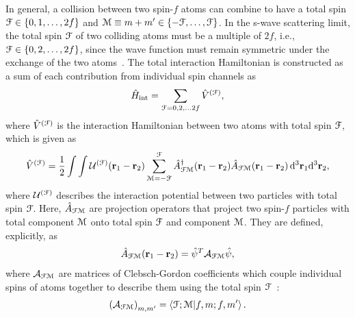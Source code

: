 In general, a collision between two spin-\(f\) atoms can combine to have a total
spin \(\EuScript{F} \in \{0, 1, \ldots, 2f\}\) and
\(\EuScript{M} \equiv m + m' \in \{-\EuScript{F}, \ldots, \EuScript{F}\}\).
In the s-wave scattering limit, the total spin \(\EuScript{F}\) of two colliding
atoms must be a multiple of \(2f\), i.e., \(\EuScript{F} \in
\{0, 2, \ldots, 2f\}\), since the wave function must remain symmetric under the
exchange of the two atoms~\cite{Pethick2008}.
The total interaction Hamiltonian is constructed as a sum of each
contribution from individual spin channels as~\cite{Kawaguchi2012}
\begin{align}\label{eq: general-interaction-hamiltonian}
    \hat{H}_\text{int} = \sum_{\EuScript{F}=0, 2, \ldots 2f}
    \hat{V}^{(\EuScript{F})},
\end{align}
where \(\hat{V}^{(\EuScript{F})}\) is the interaction Hamiltonian between two
atoms with total spin \(\EuScript{F}\), which is given as
\begin{align}\label{eq: spin-channel-hamiltonian-full-form}
    \hat{V}^{(\EuScript{F})} = \frac{1}{2}\int\int
    \mathcal{U}^{(\EuScript{F})}(\vb{r}_1-\vb{r}_2)
    \sum_{\EuScript{M}=-\EuScript{F}}^{\EuScript{F}}
    \hat{A}^\dagger_{\EuScript{F}\EuScript{M}}(\vb{r}_1-\vb{r}_2)
    \hat{A}_{\EuScript{F}\EuScript{M}}(\vb{r}_1-\vb{r}_2) \,
    \dd^3\vb{r}_1\dd^3\vb{r}_2,
\end{align} 
where \(\mathcal{U}^{(\EuScript{F})}\) describes the interaction potential
between two particles with total spin \(\EuScript{F}\).
Here, \(\hat{A}_{\EuScript{F}\EuScript{M}}\) are projection operators
that project two spin-\(f\) particles with total component \(\EuScript{M}\)
onto total spin \(\EuScript{F}\) and component \(\EuScript{M}\).
They are defined, explicitly, as
\begin{align}\label{eq: irreducible-operator}
    \hat{A}_{\EuScript{F}\EuScript{M}}(\vb{r}_1-\vb{r}_2) =
    \hat{\psi}^T\mathcal{A}_{\EuScript{F}\EuScript{M}}\hat{\psi},
\end{align}
where \(\mathcal{A}_{\EuScript{F}\EuScript{M}}\) are matrices of
Clebsch-Gordon coefficients which couple individual spins of atoms together
to describe them using the total spin \(\EuScript{F}\)~\cite{Kawaguchi2012}:
\begin{align}\label{eq: clebsch-gordon}
    {\left(\mathcal{A}_{\EuScript{F}\EuScript{M}}\right)}_{m,m'} =
    \braket{\EuScript{F}; \EuScript{M}}{f, m; f, m'}.
\end{align}

